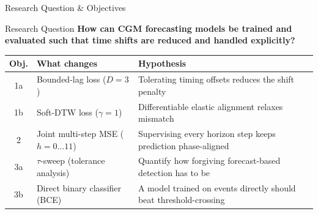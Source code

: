 \begin{frame}[t]{Research Question \& Objectives}
  \vspace*{-0.6cm}

  \begin{alertblock}{Research Question}
    \textbf{How can CGM forecasting models be trained and evaluated such that time shifts are reduced and handled explicitly?}
  \end{alertblock}

  \vspace{-4pt}

  \begin{table}
    \centering
    \footnotesize
    \renewcommand{\arraystretch}{1.15}
    \begin{tabular}{cl p{7.5cm}}
      \toprule
      \textbf{Obj.} & \textbf{What changes} & \textbf{Hypothesis} \\
      \midrule
      1a & Bounded-lag loss ($D{=}3$) & Tolerating timing offsets reduces the shift penalty \\
      1b & Soft-DTW loss ($\gamma{=}1$) & Differentiable elastic alignment relaxes mismatch \\
      \midrule
      2  & Joint multi-step MSE ($h{=}0\ldots11$) & Supervising every horizon step keeps prediction phase-aligned \\
      \midrule
      3a & $\tau$-sweep (tolerance analysis) & Quantify how forgiving forecast-based detection has to be \\
      3b & Direct binary classifier (BCE) & A model trained on events directly should beat threshold-crossing \cite{huni2023} \\
      \bottomrule
    \end{tabular}
  \end{table}
\end{frame}

